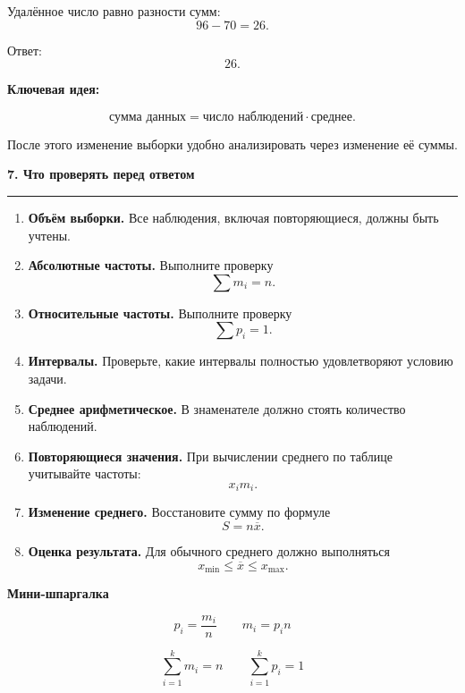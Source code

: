 \documentclass[a4paper,12pt]{article}
\newcommand{\sectiontitle}[1]{%
    \vspace{0.4em}
    {\Large\bfseries\color{darkaccent}#1\par}
    \vspace{0.25em}
    {\color{linegray}\rule{\linewidth}{0.6pt}}
    \vspace{0.7em}
}
\newcommand{\subsectiontitle}[1]{%
    \vspace{0.5em}
    {\large\bfseries\color{accent}#1\par}
    \vspace{0.25em}
}
\newcommand{\important}[1]{%
    {\color{darkaccent}\bfseries #1}
}
\begin{document}
Удалённое число равно разности сумм:
\[
96-70=26.
\]

Ответ:
\[
\boxed{26}.
\]

\important{Ключевая идея:}
\[
\text{сумма данных}
=
\text{число наблюдений}\cdot
\text{среднее}.
\]

После этого изменение выборки удобно анализировать через изменение её суммы.




\sectiontitle{7. Что проверять перед ответом}

\begin{enumerate}[leftmargin=9mm,itemsep=4pt]
    \item
    \textbf{Объём выборки.}
    Все наблюдения, включая повторяющиеся, должны быть учтены.

    \item
    \textbf{Абсолютные частоты.}
    Выполните проверку
    \[
    \sum m_i=n.
    \]

    \item
    \textbf{Относительные частоты.}
    Выполните проверку
    \[
    \sum p_i=1.
    \]

    \item
    \textbf{Интервалы.}
    Проверьте, какие интервалы полностью удовлетворяют условию задачи.

    \item
    \textbf{Среднее арифметическое.}
    В знаменателе должно стоять количество наблюдений.

    \item
    \textbf{Повторяющиеся значения.}
    При вычислении среднего по таблице учитывайте частоты:
    \[
    x_i m_i.
    \]

    \item
    \textbf{Изменение среднего.}
    Восстановите сумму по формуле
    \[
    S=n\overline{x}.
    \]

    \item
    \textbf{Оценка результата.}
    Для обычного среднего должно выполняться
    \[
    x_{\min}\le\overline{x}\le x_{\max}.
    \]
\end{enumerate}

\subsectiontitle{Мини-шпаргалка}

\[
\boxed{
p_i=\frac{m_i}{n}
}
\qquad
\boxed{
m_i=p_i n
}
\]

\[
\boxed{
\sum_{i=1}^{k}m_i=n
}
\qquad
\boxed{
\sum_{i=1}^{k}p_i=1
}
\]
\end{document}
